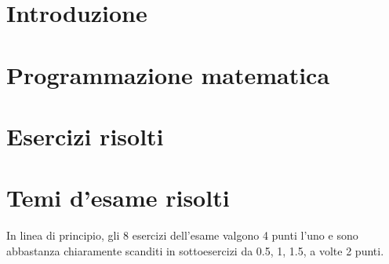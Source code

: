\providecommand{\main}{.}









{\hypersetup{hidelinks}
  \tableofcontents  %
}

\chapter{Introduzione}



\clearpage
\chapter{Programmazione matematica}

\clearpage

\clearpage

\clearpage

\clearpage

\clearpage

\clearpage

\clearpage



\appendix
\chapter{Esercizi risolti}


\chapter{Temi d'esame risolti}

In linea di principio, gli 8 esercizi dell'esame valgono 4 punti l'uno e sono abbastanza chiaramente scanditi in sottoesercizi da 0.5, 1, 1.5, a volte 2 punti.


\clearpage

\clearpage

\clearpage




